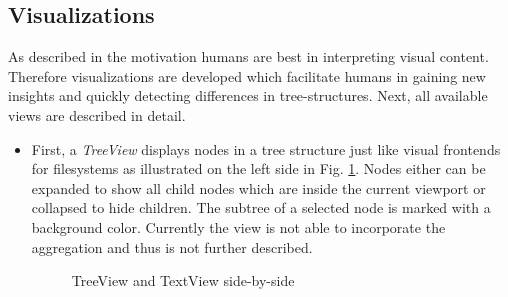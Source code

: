 \subsection{Visualizations}
As described in the motivation humans are best in interpreting visual content. Therefore visualizations are developed which facilitate humans in gaining new insights and quickly detecting differences in tree-structures. Next, all available views are described in detail. %

\begin{itemize}
\item
First, a \emph{TreeView} displays nodes in a tree structure just like visual frontends for filesystems as illustrated on the left side in Fig. \ref{fig:treetextview}. Nodes either can be expanded to show all child nodes which are inside the current viewport or collapsed to hide children. The subtree of a selected node is marked with a background color. Currently the view is not able to incorporate the aggregation and thus is not further described.

\begin{figure}[tb]
\caption{\label{fig:treetextview} TreeView and TextView side-by-side}
\end{figure}


\end{itemize}
